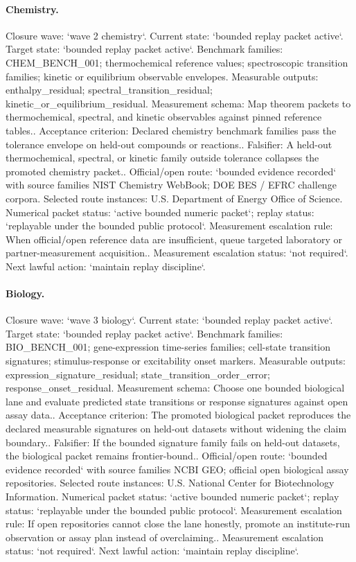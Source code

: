 \paragraph{Chemistry.}
Closure wave: `wave 2 chemistry`. Current state: `bounded replay packet active`. Target state: `bounded replay packet active`.
Benchmark families: CHEM\_BENCH\_001; thermochemical reference values; spectroscopic transition families; kinetic or equilibrium observable envelopes.
Measurable outputs: enthalpy\_residual; spectral\_transition\_residual; kinetic\_or\_equilibrium\_residual.
Measurement schema: Map theorem packets to thermochemical, spectral, and kinetic observables against pinned reference tables..
Acceptance criterion: Declared chemistry benchmark families pass the tolerance envelope on held-out compounds or reactions..
Falsifier: A held-out thermochemical, spectral, or kinetic family outside tolerance collapses the promoted chemistry packet..
Official/open route: `bounded evidence recorded` with source families NIST Chemistry WebBook; DOE BES / EFRC challenge corpora.
Selected route instances: U.S. Department of Energy Office of Science.
Numerical packet status: `active bounded numeric packet`; replay status: `replayable under the bounded public protocol`.
Measurement escalation rule: When official/open reference data are insufficient, queue targeted laboratory or partner-measurement acquisition..
Measurement escalation status: `not required`.
Next lawful action: `maintain replay discipline`.

\paragraph{Biology.}
Closure wave: `wave 3 biology`. Current state: `bounded replay packet active`. Target state: `bounded replay packet active`.
Benchmark families: BIO\_BENCH\_001; gene-expression time-series families; cell-state transition signatures; stimulus-response or excitability onset markers.
Measurable outputs: expression\_signature\_residual; state\_transition\_order\_error; response\_onset\_residual.
Measurement schema: Choose one bounded biological lane and evaluate predicted state transitions or response signatures against open assay data..
Acceptance criterion: The promoted biological packet reproduces the declared measurable signatures on held-out datasets without widening the claim boundary..
Falsifier: If the bounded signature family fails on held-out datasets, the biological packet remains frontier-bound..
Official/open route: `bounded evidence recorded` with source families NCBI GEO; official open biological assay repositories.
Selected route instances: U.S. National Center for Biotechnology Information.
Numerical packet status: `active bounded numeric packet`; replay status: `replayable under the bounded public protocol`.
Measurement escalation rule: If open repositories cannot close the lane honestly, promote an institute-run observation or assay plan instead of overclaiming..
Measurement escalation status: `not required`.
Next lawful action: `maintain replay discipline`.

